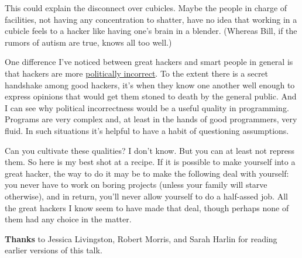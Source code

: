 This could explain the disconnect over cubicles. Maybe the people in
charge of facilities, not having any concentration to shatter, have no
idea that working in a cubicle feels to a hacker like having one's brain
in a blender. (Whereas Bill, if the rumors of autism are true, knows all
too well.)

One difference I've noticed between great hackers and smart people in
general is that hackers are more \href{say.html}{politically incorrect}.
To the extent there is a secret handshake among good hackers, it's when
they know one another well enough to express opinions that would get
them stoned to death by the general public. And I can see why political
incorrectness would be a useful quality in programming. Programs are
very complex and, at least in the hands of good programmers, very fluid.
In such situations it's helpful to have a habit of questioning
assumptions.

Can you cultivate these qualities? I don't know. But you can at least
not repress them. So here is my best shot at a recipe. If it is possible
to make yourself into a great hacker, the way to do it may be to make
the following deal with yourself: you never have to work on boring
projects (unless your family will starve otherwise), and in return,
you'll never allow yourself to do a half-assed job. All the great
hackers I know seem to have made that deal, though perhaps none of them
had any choice in the matter.


\textbf{Thanks} to Jessica Livingston, Robert Morris, and Sarah Harlin
for reading earlier versions of this talk.
